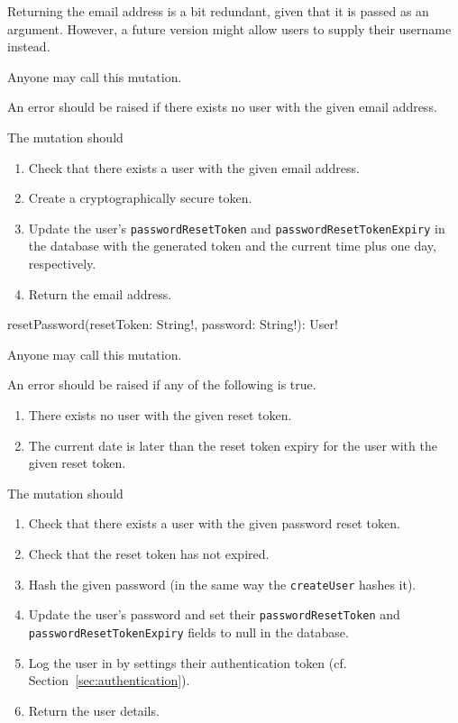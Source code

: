\begin{note}
Returning the email address is a bit redundant, given that it is passed as an argument. However, a future version might allow users to supply their username instead.
\end{note}

\restrictions

Anyone may call this mutation.

\errors

An error should be raised if there exists no user with the given email address.

\functionality

The mutation should

\begin{enumerate}
    \item Check that there exists a user with the given email address.
    \item Create a cryptographically secure token.
    \item Update the user's \verb|passwordResetToken| and \verb|passwordResetTokenExpiry| in the database with the generated token and the current time plus one day, respectively.
    \item Return the email address.
\end{enumerate}


\begin{code}
resetPassword(resetToken: String!, password: String!): User!
\end{code}

\restrictions

Anyone may call this mutation.

\errors

An error should be raised if any of the following is true.

\begin{enumerate}
    \item There exists no user with the given reset token.
    \item The current date is later than the reset token expiry for the user with the given reset token.
\end{enumerate}

\functionality

The mutation should

\begin{enumerate}
    \item Check that there exists a user with the given password reset token.
    \item Check that the reset token has not expired.
    \item Hash the given password (in the same way the \verb|createUser| hashes it).
    \item Update the user's password and set their \verb|passwordResetToken| and \verb|passwordResetTokenExpiry| fields to null in the database.
    \item Log the user in by settings their authentication token (cf. Section~\ref{sec:authentication}).
    \item Return the user details.
\end{enumerate}

